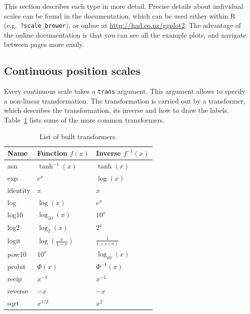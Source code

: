 \noindent  This section describes each type in more detail.  Precise details about individual scales can be found in the documentation, which can be used either within R (e.g.\ {\tt ?scale\_brewer}), or online at  \url{http://had.co.nz/ggplot2}.  The advantage of the online documentation is that you can see all the example plots, and navigate between pages more easily.

\subsection{Continuous position scales}
\label{sub:scale_position}

Every continuous scale takes a {\tt trans} argument.  This argument allows to specify a non-linear transformation.  The transformation is carried out by a transformer, which describes the transformation, its inverse and how to draw the labels. Table~\ref{tbl:common-trans} lists some of the more common transformers. 

\begin{table}
  \centering
  \begin{tabular}{lll}
    \toprule
    Name & Function $f(x)$ & Inverse $f^{-1}(x)$ \\
    \midrule
    asn       & $\tanh^{-1}(x)$ & $\tanh(x)$ \\
    exp       & $e ^ x$         & $\log(x)$  \\
    identity  & $x$             & $x$        \\
    log       & $\log(x)$       & $e ^ x$    \\
    log10     & $\log_{10}(x)$  & $10 ^ x$   \\
    log2      & $\log_2(x)$     & $2 ^ x$    \\
    logit     & $\log(\frac{x}{1 - x})$ & $\frac{1}{1 + e(x)} $ \\
    pow10     & $10^x$          & $\log_{10}(x) $ \\
    probit    & $\Phi(x)$       & $\Phi^{-1}(x)$ \\
    recip     & $x^{-1}$        & $x^{-1}$ \\
    reverse   & $-x$            & $-x$     \\
    sqrt      & $x^{1/2}$       & $x ^ 2$  \\
    \bottomrule
  \end{tabular}
  \caption{List of built transformers.}
  \label{tbl:common-trans}
\end{table}

